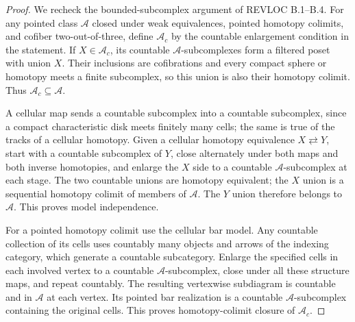 \begin{proof}
We recheck the bounded-subcomplex argument of REVLOC B.1--B.4. For any pointed class $\mathcal A$ closed under weak equivalences, pointed homotopy colimits, and cofiber two-out-of-three, define $\mathcal A_c$ by the countable enlargement condition in the statement. If $X\in\mathcal A_c$, its countable $\mathcal A$-subcomplexes form a filtered poset with union $X$. Their inclusions are cofibrations and every compact sphere or homotopy meets a finite subcomplex, so this union is also their homotopy colimit. Thus $\mathcal A_c\subseteq\mathcal A$.

A cellular map sends a countable subcomplex into a countable subcomplex, since a compact characteristic disk meets finitely many cells; the same is true of the tracks of a cellular homotopy. Given a cellular homotopy equivalence $X\rightleftarrows Y$, start with a countable subcomplex of $Y$, close alternately under both maps and both inverse homotopies, and enlarge the $X$ side to a countable $\mathcal A$-subcomplex at each stage. The two countable unions are homotopy equivalent; the $X$ union is a sequential homotopy colimit of members of $\mathcal A$. The $Y$ union therefore belongs to $\mathcal A$. This proves model independence.

For a pointed homotopy colimit use the cellular bar model. Any countable collection of its cells uses countably many objects and arrows of the indexing category, which generate a countable subcategory. Enlarge the specified cells in each involved vertex to a countable $\mathcal A$-subcomplex, close under all these structure maps, and repeat countably. The resulting vertexwise subdiagram is countable and in $\mathcal A$ at each vertex. Its pointed bar realization is a countable $\mathcal A$-subcomplex containing the original cells. This proves homotopy-colimit closure of $\mathcal A_c$.


\end{proof}
